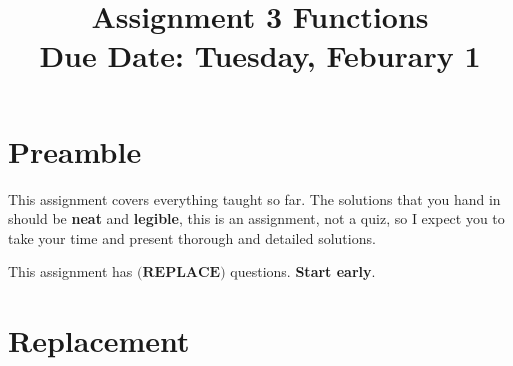\documentclass[12pt]{article} %
\title{\textbf{Assignment 3 Functions} \\ \textbf{Due Date: } Tuesday, Feburary 1}
\date{}
\begin{document}
	\renewcommand*{\coursecode}{MATH 235} %
	\renewcommand*{\assgnnumber}{Assignment 1} %
	\renewcommand*{\submdate}{September 14, 2021} %
	\renewcommand*{\studentfname}{Abdullah} %
	\renewcommand*{\studentlname}{Zubair} %
    \renewcommand*{\proofname}{Proof:}

	\renewcommand\qedsymbol{$\blacksquare$}
	\setfigpath
	\fancyhfoffset[L,O]{0pt} %



\maketitle
	\section{Preamble}
  This assignment covers everything taught so far. The solutions that you hand in should be \textbf{neat} and \textbf{legible},
  this is an assignment, not a quiz, so I expect you to take your time and present thorough and detailed solutions.

  This assignment has $\textbf{(REPLACE)}$ questions. \textbf{Start early}.
  \section{Replacement} 
\end{document}
